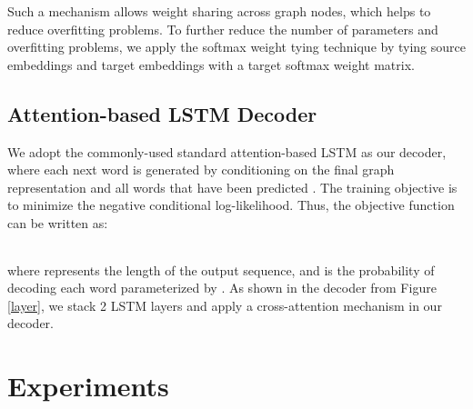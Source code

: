\documentclass[11pt,a4paper]{article}
\begin{document}
Such a mechanism allows weight sharing across graph nodes, which helps to reduce overfitting problems.
To further reduce the number of parameters and overfitting problems, we apply the softmax weight tying technique \cite{press2017using} by tying source embeddings and target embeddings with a target softmax weight matrix.












\subsection{Attention-based LSTM Decoder}
We adopt the commonly-used standard attention-based LSTM as our decoder, where each next word  is generated by conditioning on the final graph representation  and all words that have been predicted . The training objective is to minimize the negative conditional log-likelihood. 
Thus, the objective function can be written as:
\begin{center}
\begin{tabular}{c}
		
	\end{tabular}
\end{center}
where  represents the length of the output sequence, and  is the probability of decoding each word  parameterized by .
As shown in the decoder from Figure \ref{layer}, we stack 2 LSTM layers and apply a cross-attention mechanism in our decoder.

\section{Experiments}
\end{document}
